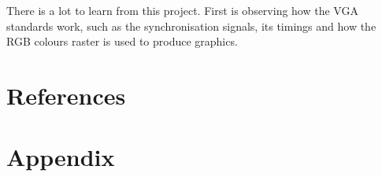 \documentclass[aps, secnumarabic, balancelastpage, asmath, amssymb, nofootinbib, floatfix,]{revtex4-2}
\begin{document}
{There is a lot to learn from this project. First is observing how the VGA standards work, such as the synchronisation signals, its timings and how the RGB colours raster is used to produce graphics. 



\clearpage


\section{\fontsize{11.3pt}{12pt}\selectfont \bf References}
\fontsize{11pt}{12pt}\selectfont \label{sec:5}



\clearpage


\section{\fontsize{11.3pt}{12pt}\selectfont \bf Appendix}
\fontsize{11pt}{12pt}\selectfont \label{sec:app}


}
\end{document}
